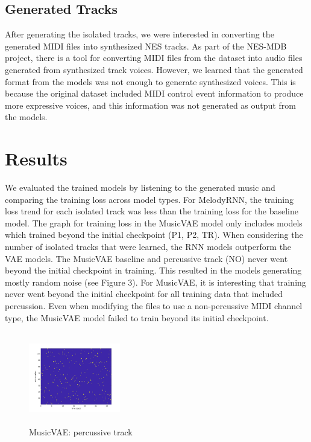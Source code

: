 \documentclass{article}
\begin{document}
\subsection{Generated Tracks}
After generating the isolated tracks, we were interested in converting the generated MIDI files into synthesized NES tracks. As part of the NES-MDB project, there is a tool for converting MIDI files from the dataset into audio files generated from synthesized track voices. However, we learned that the generated format from the models was not enough to generate synthesized voices. This is because the original dataset included MIDI control event information to produce more expressive voices, and this information was not generated as output from the models.


\section{Results}

We evaluated the trained models by listening to the generated music and comparing the training loss across model types. For MelodyRNN, the training loss trend for each isolated track was less than the training loss for the baseline model. The graph for training loss in the MusicVAE model only includes models which trained beyond the initial checkpoint (P1, P2, TR). When considering the number of isolated tracks that were learned, the RNN models outperform the VAE models. The MusicVAE baseline and percussive track (NO) never went beyond the initial checkpoint in training. This resulted in the models generating mostly random noise (see Figure 3). For MusicVAE, it is interesting that training never went beyond the initial checkpoint for all training data that included percussion. Even when modifying the files to use a non-percussive MIDI channel type, the MusicVAE model failed to train beyond its initial checkpoint.

\begin{figure}[htb!]
  \begin{minipage}{1.0\textwidth}
    \centering
    \includegraphics[height=4cm, width=4cm]{img/vae_no.jpg}
    \caption{MusicVAE: percussive track}
  \end{minipage}
\end{figure}
\end{document}
